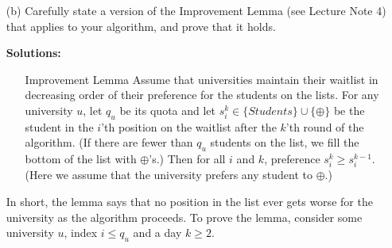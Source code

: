 \documentclass[11pt]{article}
\newif\ifsolutions
\renewcommand{\answer}[1]{{\color{mydarkblue}\textbf{Solutions: }#1}}
\begin{document}
\begin{qunlist}
\begin{itemize}
\ifsolutions
\answer{
We will extend the propose-and-reject algorithm given in the lecture notes.
Students will play the role of men and universities will play the role of women.
Instead of keeping a single person as in the original algorithm, 
each university will keep a \textit{waitlist} of size equal to its quota.
The extended procedure works as follows:
\begin{itemize}
\item All students apply to their first-choice university.
\item Each university $u$ with a quota of $q_u$, then places on its waitlist
the $q_u$ applicants who rank highest
(or all the applicants if there are fewer than $q_u$ of them) and rejects all the rest.
\item Rejected applicants then apply to their second-choice university, 
and again each university $u$ selects the top $q_u$ students 
from among the new applicants AND those on its waitlist;
it puts the selected students on its new waitlist, and rejects the rest of its applicants
(including those who were previously on its waitlist but now are not).
\item The above procedure is repeated until every applicant is either on a waitlist 
or has been rejected by every university.
At this point, each university admits everyone on its waitlist. 
\end{itemize}
}
\fi


\item[(b)] Carefully state a version of the Improvement Lemma (see Lecture Note 4) 
that applies to your algorithm, and prove that it holds.

\ifsolutions
\answer{
\begin{itemize}
\item[Improvement Lemma] Assume that universities maintain their waitlist in decreasing order of
their preference for the students on the lists.
For any university $u$, let $q_u$ be its quota and let $s_i^k \in \{Students\}\cup\{\oplus\}$
be the student in the $i$'th position on the waitlist after the $k$'th round of the algorithm.
(If there are fewer than $q_u$ students on the list, we fill the bottom of the list with $\oplus$'s.)
Then for all $i$ and $k$, preference $s_i^k \geq s_i^{k-1}$. 
(Here we assume that the university prefers any student to $\oplus$.)
\end{itemize}
In short, the lemma says that no position in the list ever gets worse for the university 
as the algorithm proceeds.
To prove the lemma, consider some university $u$, index $i \leq q_u$ and a day $k \geq 2$.

}
\end{itemize}
\end{qunlist}
\end{document}
